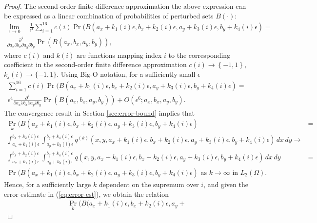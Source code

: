 \begin{proof}
  The second-order finite difference approximation the above
  expression can be expressed as a linear combination of probabilities
  of perturbed sets $B(\cdot)$:
  \begin{multline*}
    \lim_{\epsilon \to 0}\quad \frac{1}{\epsilon^4} \sum_{i=1}^{16} c(i) \Pr(B(a_x + k_1(i)\epsilon, b_x + k_2(i)\epsilon, a_y + k_3(i)\epsilon, b_y + k_4(i)\epsilon) = \\
    \frac{\partial^4}{\partial a_x \partial b_x \partial a_y \partial b_y} \Pr(B(a_x, b_x, a_y, b_y)),
  \end{multline*}
where $c(i)$ and $k(i)$ are functions mapping index $i$ to the
corresponding coefficient in the second-order finite difference
approximation
  $c(i) \to \left\{-1, 1\right\}$, $k_j(i) \to \{-1,1\}$. Using Big-O
  notation, for a sufficiently small $\epsilon$
  \begin{multline}
    \sum_{i=1}^{16} c(i) \Pr(B(a_x + k_1(i)\epsilon, b_x +
    k_2(i)\epsilon, a_y + k_3(i)\epsilon, b_y + k_4(i)\epsilon) = \\
    \epsilon^4 \frac{\partial^4}{\partial a_x \partial b_x \partial
      a_y \partial b_y} \Pr(B(a_x, b_x, a_y, b_y)) + O(\epsilon^6 ;
    a_x, b_x, a_y, b_y). \label{eq:fin-diff}
  \end{multline}
  The convergence result in Section \ref{sec:error-bound} implies that
  \begin{align*}
    \Pr_k(B(a_x + k_1(i)\epsilon, b_x + k_2(i)\epsilon, a_y +
    k_3(i)\epsilon, b_y + k_4(i)\epsilon) &= \\
    \displaystyle \int_{a_x +
    k_1(i)\epsilon}^{b_x + k_2(i)\epsilon} \displaystyle \int_{a_y + k_3(i)\epsilon}^{b_y +
    k_4(i)\epsilon} q^{(k)}(x,y,a_x+k_1(i)\epsilon,b_x+k_2(i)\epsilon,a_y+k_3(i)\epsilon,b_y+k_4(i)\epsilon)\, dx\, dy \to \\
    \displaystyle
    \int_{a_x + k_1(i)\epsilon}^{b_x + k_2(i)\epsilon} \displaystyle \int_{a_y +
    k_3(i)\epsilon}^{b_y + k_4(i)\epsilon} q(x,y,a_x+k_1(i)\epsilon,b_x+k_2(i)\epsilon,a_y+k_3(i)\epsilon,b_y+k_4(i)\epsilon)\, dx\, dy &= \\
     \Pr(B(a_x + k_1(i)\epsilon, b_x + k_2(i)\epsilon, a_y +
    k_3(i)\epsilon, b_y + k_4(i)\epsilon) \mbox{ as } k \to \infty \mbox{ in } L_2(\Omega).
  \end{align*}
  Hence, for a sufficiently large $k$ dependent on the supremum over
  $i$, and given the error estimate in (\ref{eq:error-est}), we obtain
  the relation
  \begin{multline*}
    \Pr_k(B(a_x + k_1(i)\epsilon, b_x + k_2(i)\epsilon, a_y +

\end{multline*}
\end{proof}
